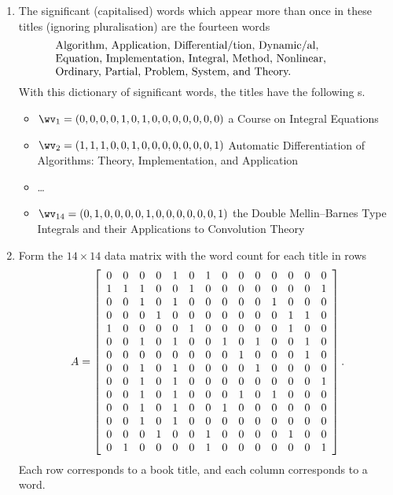 \begin{enumerate}
\item  The significant (capitalised) words which appear more than once in these titles (ignoring pluralisation) are the fourteen words
\begin{equation}
\parbox{0.8\linewidth}{\raggedright
Algorithm,
Application,
Differential/tion,
Dynamic/al,
Equation,
Implementation,
Integral,
Method,
Nonlinear,
Ordinary,
Partial,
Problem,
System, and
Theory.}
\label{eq:lsidict}
\end{equation}
With this dictionary of significant words, the titles have the following s.
\begin{itemize}
\item \(\wv_1=(0,0,0,0,1,0,1,0,0,0,0,0,0,0)\) a Course on Integral Equations
\item \(\wv_2=(1,1,1,0,0,1,0,0,0,0,0,0,0,1)\) Automatic Differentiation of Algorithms: Theory, Implementation, and Application
\item \ldots
\item \(\wv_{14}=(0,1,0,0,0,0,1,0,0,0,0,0,0,1)\) the Double Mellin--Barnes Type Integrals and their Applications to Convolution Theory
\end{itemize}


\item Form the \(14\times14\) data matrix with the word count for each title in rows 
\begin{equation*}
A=\left[\begin{array}{*{14}c}
0&0&0&0&1&0&1&0&0&0&0&0&0&0 \\
1&1&1&0&0&1&0&0&0&0&0&0&0&1 \\
0&0&1&0&1&0&0&0&0&0&1&0&0&0 \\
0&0&0&1&0&0&0&0&0&0&0&1&1&0 \\
1&0&0&0&0&1&0&0&0&0&0&1&0&0 \\
0&0&1&0&1&0&0&1&0&1&0&0&1&0 \\
0&0&0&0&0&0&0&0&1&0&0&0&1&0 \\
0&0&1&0&1&0&0&0&0&1&0&0&0&0 \\
0&0&1&0&1&0&0&0&0&0&0&0&0&1 \\
0&0&1&0&1&0&0&0&1&0&1&0&0&0 \\
0&0&1&0&1&0&0&1&0&0&0&0&0&0 \\
0&0&1&0&1&0&0&0&0&0&0&0&0&0 \\
0&0&0&1&0&0&1&0&0&0&0&1&0&0 \\
0&1&0&0&0&0&1&0&0&0&0&0&0&1
\end{array}\right].
\end{equation*}
Each row corresponds to a book title, and each column corresponds to a word.
\setbox\ajrqrbox\hbox{}%
\marginpar{\usebox{\ajrqrbox\\[2ex]}}%



\end{enumerate}

